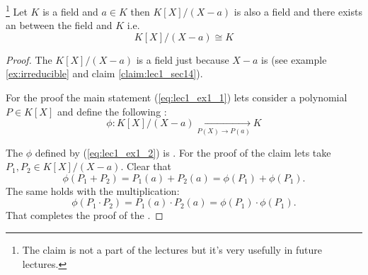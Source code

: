 \begin{claim}
  \footnote{
    The claim is not a part of the lectures but it's very usefully in
    future lectures.
  }
  Let $K$ is a field and $a \in K$ then $K\left[X\right]/\left(X -
  a\right)$ is also a field and there exists an
   between the field and $K$ i.e.
  \begin{equation}
    K\left[X\right]/\left(X - a\right) \cong K
    \label{eq:lec1_ex1_1}
  \end{equation}
  \label{claim:lec1_fieldquotionisomorphism}
  \begin{proof}
    The $K\left[X\right]/\left(X - a\right)$ is a field just because
    $X-a$ is
     (see example \ref{ex:irreducible} and
    claim \ref{claim:lec1_sec14}).

    For the proof the main statement (\ref{eq:lec1_ex1_1}) lets consider a
    polynomial $P \in  K\left[X\right]$ and 
    define the following :
    \begin{equation}
      \phi: K\left[X\right]/\left(X - a\right)
      \xrightarrow[P(X) \to P(a)]{} K
      \label{eq:lec1_ex1_2}
    \end{equation}

    The $\phi$ defined by (\ref{eq:lec1_ex1_2}) is
    . For the proof of the claim lets take
    $P_1, P_2 \in K\left[X\right]/\left(X - a\right)$. Clear that
    \[
    \phi\left(P_1 + P_2\right) = P_1\left(a\right) + P_2\left(a\right)
    = \phi\left(P_1\right) + \phi\left(P_1\right).
    \]
    The same holds with the multiplication:
    \[
    \phi\left(P_1 \cdot P_2\right) = P_1\left(a\right) \cdot P_2\left(a\right)
    = \phi\left(P_1\right) \cdot \phi\left(P_1\right).
    \]
    That completes the proof of the .


\end{proof}
\end{claim}

